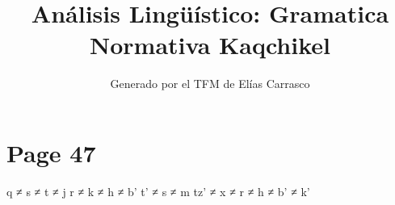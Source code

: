 \documentclass{article}%
\title{Análisis Lingüístico: Gramatica Normativa Kaqchikel}%
\author{Generado por el TFM de Elías Carrasco}%
\begin{document}
%
\normalsize%
\maketitle%
\section{Page 47}%
\label{sec:Page47}%
q ≠ s ≠ t ≠ j %
r ≠ k ≠ h ≠ b' %
t' ≠ s ≠ m %
tz' ≠ x ≠ r ≠ h ≠ b' ≠ k' 

%
\end{document}

